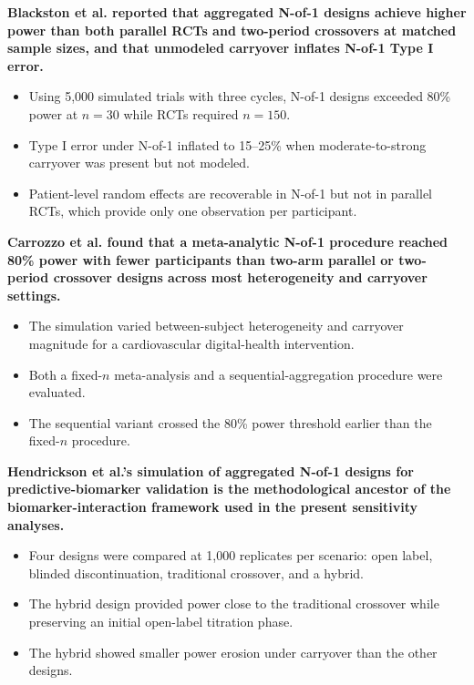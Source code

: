 \documentclass[
  11pt,
]{article}
\begin{document}
\textbf{Blackston et al. reported that aggregated N-of-1 designs achieve higher power than both parallel RCTs and two-period crossovers at matched sample sizes, and that unmodeled carryover inflates N-of-1 Type I error.}

\begin{itemize}\setlength{\itemsep}{2pt}\setlength{\parskip}{0pt}
\item Using 5,000 simulated trials with three cycles, N-of-1 designs exceeded 80\% power at $n = 30$ while RCTs required $n = 150$.
\item Type I error under N-of-1 inflated to 15--25\% when moderate-to-strong carryover was present but not modeled.
\item Patient-level random effects are recoverable in N-of-1 but not in parallel RCTs, which provide only one observation per participant.
\end{itemize}

\textbf{Carrozzo et al. found that a meta-analytic N-of-1 procedure reached 80\% power with fewer participants than two-arm parallel or two-period crossover designs across most heterogeneity and carryover settings.}

\begin{itemize}\setlength{\itemsep}{2pt}\setlength{\parskip}{0pt}
\item The simulation varied between-subject heterogeneity and carryover magnitude for a cardiovascular digital-health intervention.
\item Both a fixed-$n$ meta-analysis and a sequential-aggregation procedure were evaluated.
\item The sequential variant crossed the 80\% power threshold earlier than the fixed-$n$ procedure.
\end{itemize}

\textbf{Hendrickson et al.'s simulation of aggregated N-of-1 designs for predictive-biomarker validation is the methodological ancestor of the biomarker-interaction framework used in the present sensitivity analyses.}

\begin{itemize}\setlength{\itemsep}{2pt}\setlength{\parskip}{0pt}
\item Four designs were compared at 1,000 replicates per scenario: open label, blinded discontinuation, traditional crossover, and a hybrid.
\item The hybrid design provided power close to the traditional crossover while preserving an initial open-label titration phase.
\item The hybrid showed smaller power erosion under carryover than the other designs.
\end{itemize}
\end{document}
